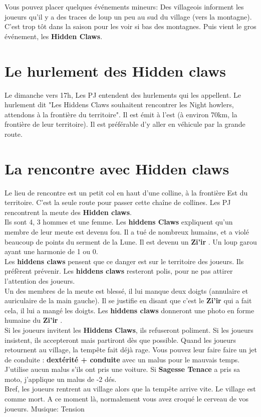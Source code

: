 \documentclass[oneside,12pt]{book}
\newcommand{\Jessica}{\textbf{Sagesse Tenace} }
\newcommand{\Thomas}{\textbf{Zi'ir} }
\begin{document}
\begin{flushleft}
Vous pouvez placer quelques événements mineurs: Des villageois informent les joueurs qu'il y a des traces de loup un peu au sud du village (vers la montagne). C'est trop tôt dans la saison pour les voir si bas des montagnes.
Puis vient le gros événement, les \textbf{Hidden Claws}.

\section{Le hurlement des Hidden claws}
Le dimanche vers 17h, Les PJ entendent des hurlements qui les appellent.  Le hurlement dit "Les Hiddens Claws souhaitent rencontrer les Night howlers, attendons à la frontière du territoire".
Il est émit à l'est (à environ 70km, la frontière de leur territoire). Il est préférable d'y aller en véhicule par la grande route. 

\section{La rencontre avec Hidden claws}
Le lieu de rencontre est un petit col en haut d'une colline, à la frontière Est du territoire. C'est la seule route pour passer cette chaîne de collines.
Les PJ rencontrent la meute des \textbf{Hidden claws}.\\ Ils sont 4, 3 hommes et une femme.
Les \textbf{hiddens Claws} expliquent qu'un membre de leur meute est devenu fou. Il a tué de nombreux humains, et a violé beaucoup de points du serment de la Lune. Il est devenu un \Thomas. Un loup garou ayant une harmonie de 1 ou 0. \\
Les \textbf{hiddens claws} pensent que ce danger est sur le territoire des joueurs. Ils préfèrent prévenir. Les \textbf{hiddens claws} resteront polis, pour ne pas attirer l'attention des joueurs. \\
Un des membres de la meute est blessé, il lui manque deux doigts (annulaire et auriculaire de la main gauche). Il se justifie en disant que c'est le \Thomas qui a fait cela, il lui a mangé les doigts. Les \textbf{hiddens claws} donneront une photo en forme humaine du \Thomas.\\
Si les joueurs invitent les \textbf{Hiddens Claws}, ils refuseront poliment. Si les joueurs insistent, ils accepteront mais partiront dès que possible.
Quand les joueurs retournent au village, la tempête fait déjà rage. Vous pouvez leur faire faire un jet de conduite : \textbf{dextérité + conduite} avec un malus pour le mauvais temps. J'utilise aucun malus s'ils ont pris une voiture. Si \Jessica a pris sa moto, j'applique un malus de -2 dés.\\
Bref, les joueurs rentrent au village alors que la tempête arrive vite. Le village est comme mort. A ce moment là, normalement vous avez croqué le cerveau de vos joueurs.  
Musique: Tension



\end{flushleft}
\end{document}
